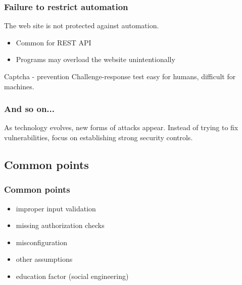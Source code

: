 \begin{frame}
\frametitle{Failure to restrict automation}
The web site is not protected against automation.
\begin{itemize}
\item Common for REST API
\item Programs may overload the website unintentionally
\end{itemize}
\begin{exampleblock}{Captcha - prevention}
Challenge-response test easy for humans, difficult for machines.
\end{exampleblock}
\end{frame}

\begin{frame}
\frametitle{And so on...}
As technology evolves, new forms of attacks appear.
Instead of trying to fix vulnerabilities, focus on establishing strong
security controls.
\end{frame}

\subsection{Common points}

\begin{frame}
\frametitle{Common points}
\begin{itemize}
\item improper input validation
\item missing authorization checks
\item misconfiguration
\item other assumptions
\item education factor \small{(social engineering)}
\end{itemize}
\end{frame}

